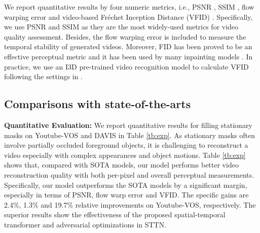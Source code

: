 \documentclass[runningheads]{llncs}
\begin{document}
We report quantitative results by four numeric metrics, i.e., PSNR \cite{xu2019deep}, SSIM \cite{chang2019free}, flow warping error \cite{lai2018learning} and video-based Fr\'{e}chet Inception Distance (VFID) \cite{chang2019free,wang2018video}. Specifically, we use PSNR and SSIM as they are the most widely-used metrics for video quality assessment. 
Besides, the flow warping error is included to measure the temporal stability of generated videos. 
Moreover, FID has been proved to be an effective perceptual metric and it has been used by many inpainting models \cite{oh2019onion,wang2018video,zhang2018unreasonable}. In practice, we use an I3D \cite{carreira2017quo} pre-trained video recognition model to calculate VFID following the settings in \cite{chang2019free,wang2018video}. 


\subsection{Comparisons with state-of-the-arts}
\label{subsec:comp}

\textbf{Quantitative Evaluation:}
We report quantitative results for filling stationary masks on Youtube-VOS \cite{xu2018youtube} and DAVIS \cite{caelles20182018} in Table \ref{tb:exp}. 
As stationary masks often involve partially occluded foreground objects, it is challenging to reconstruct a video especially with complex appearances and object motions.
Table \ref{tb:exp} shows that, compared with SOTA models, our model performs better video reconstruction quality with both per-pixel and overall perceptual measurements. 
Specifically, our model outperforms the SOTA models by a significant margin, especially in terms of PSNR, flow warp error and VFID. 
The specific gains are 2.4\%, 1.3\% and 19.7\% relative improvements on Youtube-VOS, respectively. The superior results show the effectiveness of the proposed spatial-temporal transformer and adversarial optimizations in STTN. 
\end{document}
